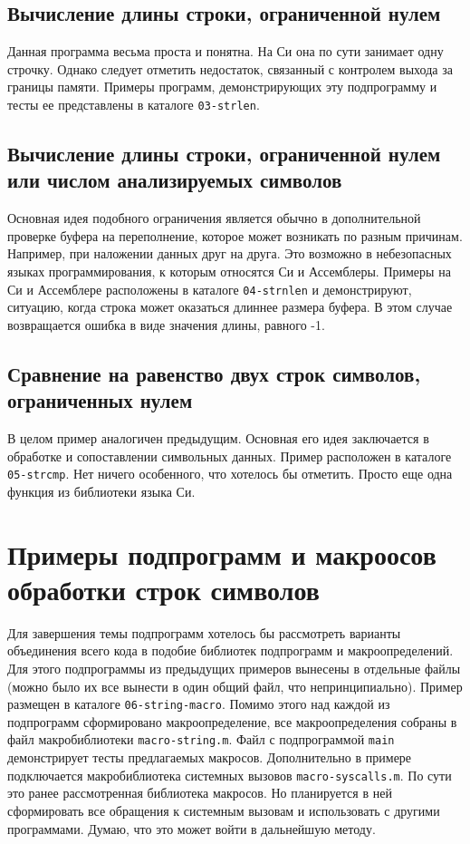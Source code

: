 \subsection{Вычисление длины строки, ограниченной нулем}

Данная программа весьма проста и понятна. На Си она по сути занимает одну строчку. Однако следует отметить недостаток, связанный с контролем выхода за границы памяти. Примеры программ, демонстрирующих эту подпрограмму и тесты ее представлены в каталоге \verb|03-strlen|.

\subsection{Вычисление длины строки, ограниченной нулем или числом анализируемых символов}

Основная идея подобного ограничения является обычно в дополнительной проверке буфера на переполнение, которое может возникать по разным причинам. Например, при наложении данных друг на друга. Это возможно в небезопасных языках программирования, к которым относятся Си и Ассемблеры. Примеры на Си и Ассемблере расположены в каталоге \verb|04-strnlen| и демонстрируют, ситуацию, когда строка может оказаться длиннее размера буфера. В этом случае возвращается ошибка в виде значения длины, равного -1.

\subsection{Сравнение на равенство двух строк символов, ограниченных нулем}

В целом пример аналогичен предыдущим. Основная его идея заключается в обработке и сопоставлении символьных данных. Пример расположен в каталоге \verb|05-strcmp|. Нет ничего особенного, что хотелось бы отметить. Просто еще одна функция из библиотеки языка Си.

\section{Примеры подпрограмм и макроосов обработки строк символов}

Для завершения темы подпрограмм хотелось бы рассмотреть варианты объединения всего кода в подобие библиотек подпрограмм и макроопределений. Для этого подпрограммы из предыдущих примеров вынесены в отдельные файлы (можно было их все вынести в один общий файл, что непринципиально). Пример размещен в каталоге \verb|06-string-macro|. Помимо этого над каждой из подпрограмм сформировано макроопределение, все макроопределения собраны в файл макробиблиотеки \verb|macro-string.m|. Файл с подпрограммой \verb|main| демонстрирует тесты предлагаемых макросов. Дополнительно в примере подключается макробиблиотека системных вызовов \verb|macro-syscalls.m|. По сути это ранее рассмотренная библиотека макросов. Но планируется в ней сформировать все обращения к системным вызовам и использовать с другими программами. Думаю, что это может войти в дальнейшую методу.

